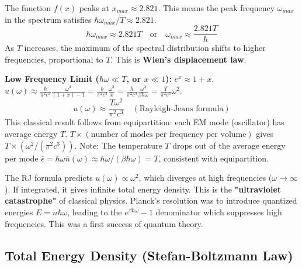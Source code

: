 \documentclass[11pt]{article}
\newcommand{\avg}[1]{\overline{#1}}
\newcommand{\eps}{\epsilon}
\newcommand{\nbar}{\overline{n}} %
\begin{document}
\begin{center}
\end{center}
The function $f(x)$ peaks at $x_{max} \approx 2.821$. This means the peak frequency $\omega_{max}$ in the spectrum satisfies $\hbar\omega_{max} / T \approx 2.821$.
\[ \hbar\omega_{max} \approx 2.821 T \quad \text{or} \quad \omega_{max} \approx \frac{2.821 T}{\hbar} \]
As $T$ increases, the maximum of the spectral distribution shifts to higher frequencies, proportional to $T$. This is \textbf{Wien's displacement law}.

\textbf{Low Frequency Limit ($\hbar\omega \ll T$, or $x \ll 1$):}
$e^x \approx 1+x$.
$u(\omega) \approx \frac{\hbar}{\pi^2 c^3} \frac{\omega^3}{(1+x)-1} = \frac{\hbar}{\pi^2 c^3} \frac{\omega^3}{x} = \frac{\hbar}{\pi^2 c^3} \frac{\omega^3}{\beta\hbar\omega} = \frac{T}{\pi^2 c^3} \omega^2$.
\[ u(\omega) \approx \frac{T \omega^2}{\pi^2 c^3} \quad (\text{Rayleigh-Jeans formula}) \]
This classical result follows from equipartition: each EM mode (oscillator) has average energy $T$. $T \times (\text{number of modes per frequency per volume})$ gives $T \times (\omega^2/(\pi^2 c^3))$.
Note: The temperature $T$ drops out of the average energy per mode $\avg{\eps} = \hbar\omega \nbar(\omega) \approx \hbar\omega / (\beta\hbar\omega) = T$, consistent with equipartition.

The RJ formula predicts $u(\omega) \propto \omega^2$, which diverges at high frequencies ($\omega \to \infty$). If integrated, it gives infinite total energy density. This is the \textbf{"ultraviolet catastrophe"} of classical physics. Planck's resolution was to introduce quantized energies $E=n\hbar\omega$, leading to the $e^{\beta\hbar\omega}-1$ denominator which suppresses high frequencies. This was a first success of quantum theory.

\subsection*{Total Energy Density (Stefan-Boltzmann Law)}
\end{document}
